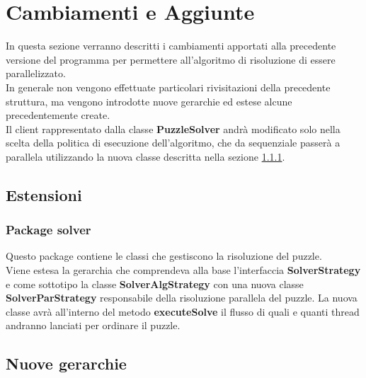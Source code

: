% 
%
%

\section{Cambiamenti e Aggiunte}
In questa sezione verranno descritti i cambiamenti apportati alla precedente versione del programma per permettere all'algoritmo di risoluzione di essere parallelizzato. \\
In generale non vengono effettuate particolari rivisitazioni della precedente struttura, ma vengono introdotte nuove gerarchie ed estese alcune precedentemente create. \\
Il client rappresentato dalla classe \textbf{PuzzleSolver} andrà modificato solo nella scelta della politica di esecuzione dell'algoritmo, che da sequenziale passerà a parallela utilizzando la nuova classe descritta nella sezione \ref{ssub:package_solver_1}.

	\subsection{Estensioni} %
	\label{sub:estensioni}
		\subsubsection{Package solver} %
		\label{ssub:package_solver_1}
		Questo package contiene le classi che gestiscono la risoluzione del puzzle. \\
		Viene estesa la gerarchia che comprendeva alla base l'interfaccia \textbf{SolverStrategy} e come sottotipo la classe \textbf{SolverAlgStrategy} con una nuova classe \textbf{SolverParStrategy} responsabile della risoluzione parallela del puzzle.
		La nuova classe avrà all'interno del metodo \textbf{executeSolve} il flusso di quali e quanti thread andranno lanciati per ordinare il puzzle.
		
	
	\subsection{Nuove gerarchie} %
	\label{sub:nuove_gerarchie}
